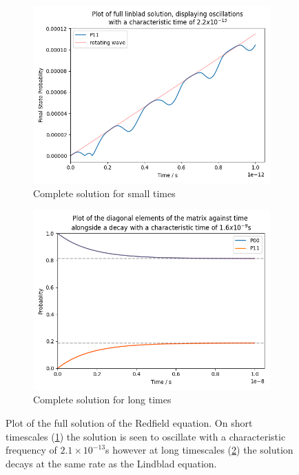 \begin{figure}[htb]
    \centering
    \begin{subfigure}{0.45\linewidth}
        \centering
        \includegraphics[width =0.9 \linewidth]{Figures/Redfield/Plot of redfield solution short time.png}
        \caption{Complete solution for small times
        }\label{fig:redfield full solution short timescales}
    \end{subfigure}
    \hfill
    \begin{subfigure}{0.45\linewidth}
        \centering
        \includegraphics[width = 0.9\linewidth]{Figures/Redfield/Plot of redfield solution long time.png}
        \caption{Complete solution for long times
        }\label{fig:redfield full solution long timescales}
    \end{subfigure}
    \caption{Plot of the full solution of the Redfield
    equation. On short timescales
    (\cref{fig:redfield full solution short timescales})
    the solution is seen to
    oscillate with a characteristic
    frequency of \(2.1\times{}10^{-13}\)s however
    at long timescales (\cref{fig:redfield full solution long timescales})
    the solution decays at the same rate as the
    Lindblad equation.}\label{fig:redfield full solution}
\end{figure}

